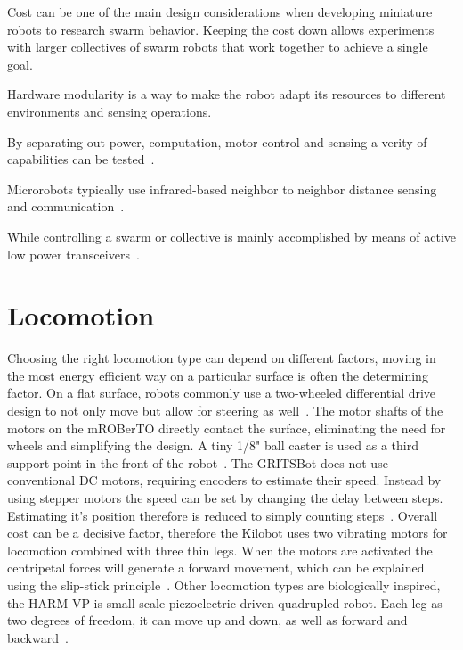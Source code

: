 Cost can be one of the main design considerations when developing miniature robots to research swarm behavior.
Keeping the cost down allows experiments with larger collectives of swarm robots that work together to achieve a single goal.


Hardware modularity is a way to make the robot adapt its resources to different environments and sensing operations.

By separating out power, computation, motor control and sensing a verity of capabilities can be tested~\cite{sabelhaus_icra_2013, pickem_icra_2015, kim_iros_2016}.

Microrobots typically use infrared-based neighbor to neighbor distance sensing and communication~\cite{rubenstein_icra_2012, pickem_icra_2015, kim_iros_2016}.

While controlling a swarm or collective is mainly accomplished by means of active low power transceivers~\cite{sabelhaus_icra_2013, pickem_icra_2015, kim_iros_2016}. 

\section{Locomotion}
\label{sec:locomotion}

Choosing the right locomotion type can depend on different factors, moving in the most energy efficient way on a particular surface is often the determining factor.
On a flat surface, robots commonly use a two-wheeled differential drive design to not only move but allow for steering as well~\cite{sabelhaus_icra_2013, pickem_icra_2015}.
The motor shafts of the motors on the mROBerTO directly contact the surface, eliminating the need for wheels and simplifying the design.
A tiny 1/8" ball caster is used as a third support point in the front of the robot~\cite{kim_iros_2016}.
The GRITSBot does not use conventional DC motors, requiring encoders to estimate their speed. 
Instead by using stepper motors the speed can be set by changing the delay between steps. 
Estimating it's position therefore is reduced to simply counting steps~\cite{pickem_icra_2015}.  
Overall cost can be a decisive factor, therefore the Kilobot uses two vibrating motors for locomotion combined with three thin legs.
When the motors are activated the centripetal forces will generate a forward movement, which can be explained using the slip-stick principle~\cite{rubenstein_icra_2012}.
Other locomotion types are biologically inspired, the HARM-VP is small scale piezoelectric driven quadrupled robot.
Each leg as two degrees of freedom, it can move up and down, as well as forward and backward~\cite{baisch_iros_2013}.

